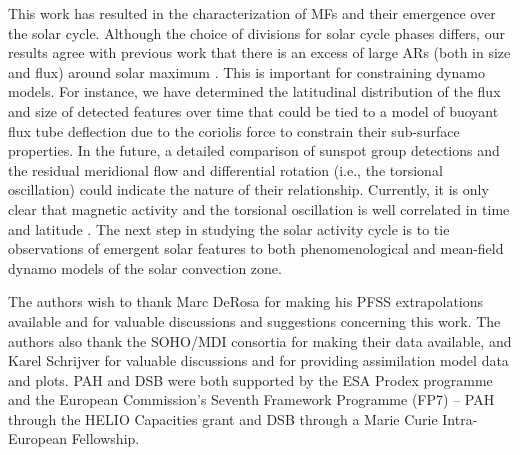 \documentclass[namedreferences]{solarphysics}
\begin{document}
\begin{article}
This work has resulted in the characterization of MFs and their emergence over the solar cycle. Although the choice of divisions for solar cycle phases differs, our results agree with previous work that there is an excess of large ARs (both in size and flux) around solar maximum \citep[e.g.,][]{tang:1984,harvey:1993,meunier:2003}. This is important for constraining dynamo models. For instance, we have determined the latitudinal distribution of the flux and size of detected features over time that could be tied to a model of buoyant flux tube deflection due to the coriolis force to constrain their sub-surface properties. In the future, a detailed comparison of sunspot group detections and the residual meridional flow and differential rotation (i.e., the torsional oscillation) could indicate the nature of their relationship. Currently, it is only clear that magnetic activity and the torsional oscillation is  well correlated in time and latitude \citep{Hathaway:2011}. The next step in studying the solar activity cycle is to tie observations of emergent solar features to both phenomenological and mean-field dynamo models of the solar convection zone.  
















\begin{acks}
The authors wish to thank Marc DeRosa for making his PFSS extrapolations available and for valuable discussions and suggestions concerning this work. The authors also thank the SOHO/MDI consortia for making their data available, and Karel Schrijver for valuable discussions and for providing assimilation model data and plots. PAH and DSB were both supported by the ESA Prodex programme and the European Commission's Seventh Framework Programme (FP7) -- PAH through the HELIO Capacities grant and DSB through a Marie Curie Intra-European Fellowship.
\end{acks}


   



\end{article}
\end{document}
